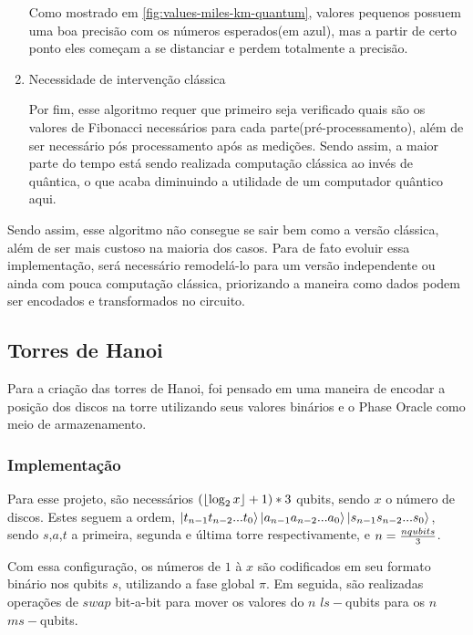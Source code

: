 \documentclass{article}
\DeclarePairedDelimiter\floor{\lfloor}{\rfloor}
\begin{document}
\begin{enumerate}
Como mostrado em \ref{fig:values-miles-km-quantum}, valores pequenos possuem uma boa precisão com os números esperados(em azul), mas a partir de certo ponto eles começam a se distanciar e perdem totalmente a precisão.

\item{Necessidade de intervenção clássica}

Por fim, esse algoritmo requer que primeiro seja verificado quais são os valores de Fibonacci necessários para cada parte(pré-processamento), além de ser necessário pós processamento após as medições. Sendo assim, a maior parte do tempo está sendo realizada computação clássica ao invés de quântica, o que acaba diminuindo a utilidade de um computador quântico aqui.

\end{enumerate}

Sendo assim, esse algoritmo não consegue se sair bem como a versão clássica, além de ser mais custoso na maioria dos casos. Para de fato evoluir essa implementação, será necessário remodelá-lo para um versão independente ou ainda com pouca computação clássica, priorizando a maneira como dados podem ser encodados e transformados no circuito.

\subsection{Torres de Hanoi} \label{hanoi}

Para a criação das torres de Hanoi, foi pensado em uma maneira de encodar a posição dos discos na torre utilizando seus valores binários e o Phase Oracle como meio de armazenamento.

\subsubsection{Implementação}

Para esse projeto, são necessários $(\floor{\log_2{x}} + 1) * 3$ qubits, sendo $x$ o número de discos. Estes seguem a ordem, $\mathinner{|{t_{n-1} t_{n-2} ... t_0}\rangle}\mathinner{|{a_{n-1} a_{n-2} ... a_0}\rangle}\mathinner{|{s_{n-1} s_{n-2} ... s_0}\rangle}$, sendo $s$,$a$,$t$ a primeira, segunda e última torre respectivamente, e $n = {{n \space qubits} \over 3}$.

Com essa configuração, os números de $1$ à $x$ são codificados em seu formato binário nos qubits $s$, utilizando a fase global $\pi$. Em seguida, são realizadas operações de $swap$ bit-a-bit para mover os valores do $n$ $ls-$qubits  para os $n$ $ms-$qubits.
\end{document}
